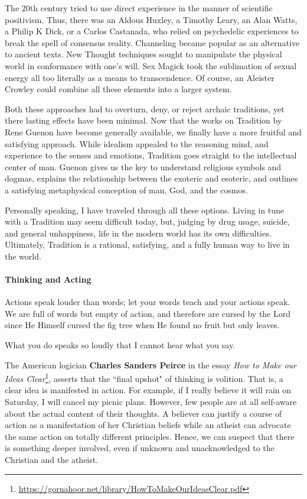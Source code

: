 The 20th century tried to use direct experience in the manner of scientific positivism. Thus, there was an Aldous Huxley, a Timothy Leary, an Alan Watts, a Philip K Dick, or a Carlos Castanada, who relied on psychedelic experiences to break the spell of consensus reality. Channeling became popular as an alternative to ancient texts. New Thought techniques sought to manipulate the physical world in conformance with one's will. Sex Magick took the sublimation of sexual energy all too literally as a means to transcendence. Of course, an Aleister Crowley could combine all these elements into a larger system.

Both these approaches had to overturn, deny, or reject archaic traditions, yet there lasting effects have been minimal. Now that the works on Tradition by Rene Guenon have become generally available, we finally have a more fruitful and satisfying approach. While idealism appealed to the reasoning mind, and experience to the senses and emotions, Tradition goes straight to the intellectual center of man. Guenon gives us the key to understand religious symbols and dogmas, explains the relationship between the exoteric and esoteric, and outlines a satisfying metaphysical conception of man, God, and the cosmos.

Personally speaking, I have traveled through all these options. Living in tune with a Tradition may seem difficult today, but, judging by drug usage, suicide, and general unhappiness, life in the modern world has its own difficulties. Ultimately, Tradition is a rational, satisfying, and a fully human way to live in the world.

\paragraph{Thinking and Acting}
\begin{quotex}
Actions speak louder than words; let your words teach and your actions speak. We are full of words but empty of action, and therefore are cursed by the Lord since He Himself cursed the fig tree when He found no fruit but only leaves. 

What you do speaks so loudly that I cannot hear what you say. 

\end{quotex}
The American logician \textbf{Charles Sanders Peirce} in the essay \textit{How to Make our Ideas Clear}\footnote{\url{https://gornahoor.net/library/HowToMakeOurIdeasClear.pdf}}, asserts that the ``final upshot" of thinking is volition. That is, a clear idea is manifested in action. For example, if I really believe it will rain on Saturday, I will cancel my picnic plans. However, few people are at all self-aware about the actual content of their thoughts. A believer can justify a course of action as a manifestation of her Christian beliefs while an atheist can advocate the same action on totally different principles. Hence, we can suspect that there is something deeper involved, even if unknown and unacknowledged to the Christian and the atheist.

